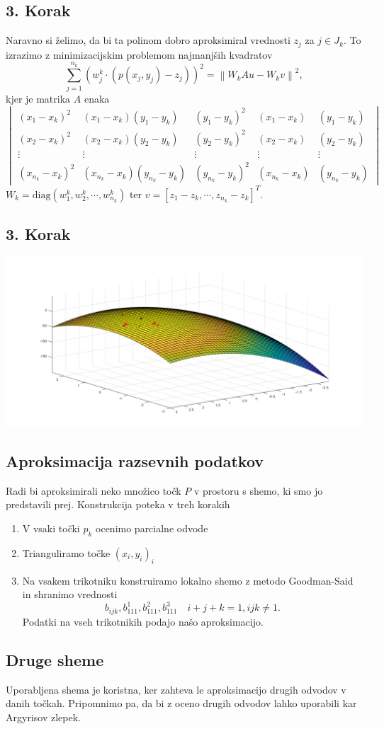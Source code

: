 \documentclass[ignorenonframetext]{beamer}
\newcommand{\norm}[1]{\left\lVert#1\right\rVert}
\let\frametitle\subsection %
\begin{document}
\begin{frame}
\frametitle{3. Korak}
Naravno si želimo, da bi ta polinom dobro aproksimiral vrednosti $z_j$ za $j \in J_k$. 
To izrazimo z minimizacijskim problemom najmanjših kvadratov
$$\sum_{j =1}^{n_k} (w^k_j \cdot (p(x_j,y_j) - z_j))^2 = \norm{W_kAu - W_kv}^2,$$
kjer je matrika $A$ enaka
\begin{equation*}
\begin{vmatrix}
(x_1 - x_k)^2 &  (x_1 - x_k) (y_1 - y_k) & (y_1 - y_k)^2 & (x_1 - x_k) & (y_1 - y_k) \\
(x_2 - x_k)^2 &  (x_2 - x_k) (y_2 - y_k) & (y_2 - y_k)^2 & (x_2 - x_k) & (y_2 - y_k) \\
\vdots & \vdots & \vdots & \vdots & \vdots \\
(x_{n_k} - x_k)^2 & (x_{n_k} - x_k) (y_{n_k} - y_k) & (y_{n_k} - y_k)^2 & (x_{n_k} - x_k) & (y_{n_k} - y_k)
\end{vmatrix}
\end{equation*}
$W_k = \text{diag}(w^k_1, w^k_2, \cdots, w^k_{n_k})$ ter $v = [z_1 - z_k, \cdots, z_{n_k} - z_k]^T$.
\end{frame}

\begin{frame}
\frametitle{3. Korak}
\includegraphics[width=\textwidth, height=\textheight]{slike/surfInterpol.png}
\end{frame}

\begin{frame}
\frametitle{Aproksimacija razsevnih podatkov}
Radi bi aproksimirali neko množico točk $P$ v prostoru s shemo, ki smo jo predstavili prej.
Konstrukcija poteka v treh korakih
\begin{enumerate}
\item V vsaki točki $p_k$ ocenimo parcialne odvode
\item Trianguliramo točke $(x_i,y_i)_i$
\item Na vsakem trikotniku konstruiramo lokalno shemo z metodo Goodman-Said in shranimo vrednosti 
$$b_{ijk}, b_{111}^1, b_{111}^2, b_{111}^3 \quad i + j + k = 1, ijk \neq 1.$$
Podatki na vseh trikotnikih podajo našo aproksimacijo.
\end{enumerate}

\end{frame}

\begin{frame}
\frametitle{Druge sheme}
Uporabljena shema je koristna, ker zahteva le aproksimacijo drugih odvodov v danih točkah.
Pripomnimo pa, da bi z oceno drugih odvodov lahko uporabili kar Argyrisov zlepek.
\end{frame}
\end{document}
